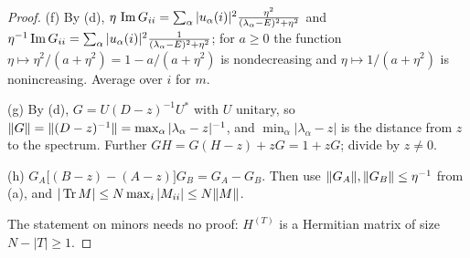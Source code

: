 \begin{proof}
(f) By (d), $\eta\,\operatorname{Im} G_{ii}=\sum_\alpha|u_\alpha(i)|^2\frac{\eta^2}{(\lambda_\alpha-E)^2+\eta^2}$ and $\eta^{-1}\operatorname{Im} G_{ii}=\sum_\alpha|u_\alpha(i)|^2\frac{1}{(\lambda_\alpha-E)^2+\eta^2}$; for $a\ge0$ the function $\eta\mapsto\eta^2/(a+\eta^2)=1-a/(a+\eta^2)$ is nondecreasing and
$\eta\mapsto1/(a+\eta^2)$ is nonincreasing. Average over $i$ for $m$.

(g) By (d), $G=U(D-z)^{-1}U^*$ with $U$ unitary, so $\|G\|=\|(D-z)^{-1}\|=\max_\alpha|\lambda_\alpha-z|^{-1}$, and $\min_\alpha|\lambda_\alpha-z|$ is the distance from $z$ to the spectrum.
Further $GH=G(H-z)+zG=1+zG$; divide by $z\ne0$.

(h) $G_A\big[(B-z)-(A-z)\big]G_B=G_A-G_B$. Then use $\|G_A\|,\|G_B\|\le\eta^{-1}$ from (a), and $|\operatorname{Tr} M|\le N\max_i|M_{ii}|\le N\|M\|$.

The statement on minors needs no proof: $H^{(T)}$ is a Hermitian matrix of size $N-|T|\ge1$.
\end{proof}

